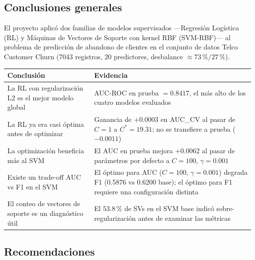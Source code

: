 \documentclass[spanish]{article}
\begin{document}
\subsection{Conclusiones generales}

El proyecto aplicó dos familias de modelos supervisados —Regresión Logística (RL) y Máquinas de Vectores de Soporte con kernel RBF (SVM-RBF)— al problema de predicción de abandono de clientes en el conjunto de datos Telco Customer Churn (7043 registros, 20 predictores, desbalance $\approx 73\,\% / 27\,\%$).

\begin{center}
\begin{tabular}{p{5.5cm}p{8cm}}
\toprule
\textbf{Conclusión} & \textbf{Evidencia} \\
\midrule
La RL con regularización L2 es el mejor modelo global & AUC-ROC en prueba $= 0.8417$, el más alto de los cuatro modelos evaluados \\
La RL ya era casi óptima antes de optimizar & Ganancia de $+0.0003$ en AUC\_CV al pasar de $C=1$ a $C^*=19.31$; no se transfiere a prueba ($-0.0011$) \\
La optimización beneficia más al SVM & El AUC en prueba mejora $+0.0062$ al pasar de parámetros por defecto a $C=100$, $\gamma=0.001$ \\
Existe un trade-off AUC vs F1 en el SVM & El óptimo para AUC ($C=100$, $\gamma=0.001$) degrada F1 (0.5876 vs 0.6200 base); el óptimo para F1 requiere una configuración distinta \\
El conteo de vectores de soporte es un diagnóstico útil & El $53.8\,\%$ de SVs en el SVM base indicó sobre-regularización antes de examinar las métricas \\
\bottomrule
\end{tabular}
\end{center}

\subsection{Recomendaciones}
\end{document}
